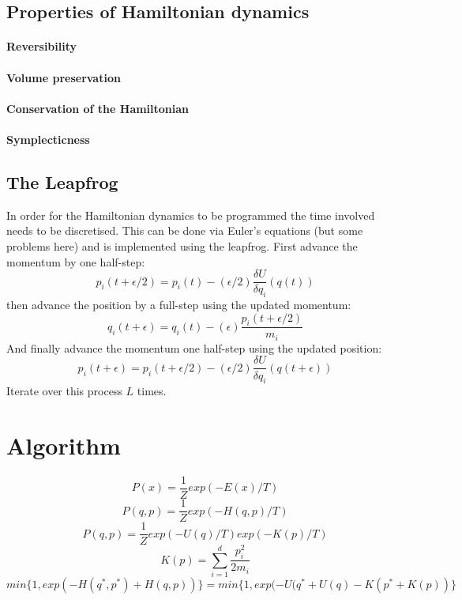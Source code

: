 \documentclass[12pt]{article}
\begin{document}
\subsection{Properties of Hamiltonian dynamics}

\paragraph{Reversibility}
\paragraph{Volume preservation}
\paragraph{Conservation of the Hamiltonian}
\paragraph{Symplecticness}
\subsection{The Leapfrog}
In order for the Hamiltonian dynamics to be programmed the time involved needs to be discretised. This can be done via Euler's equations (but some problems here) and is implemented using the leapfrog.
First advance the momentum by one half-step:
\begin{equation}
p_{i}(t+\epsilon/2) = p_{i}(t) - (\epsilon/2)\frac{\delta U}{\delta q_{i}}(q(t))
\end{equation}
then advance the position by a full-step using the updated momentum:
\begin{equation}
q_{i}(t+\epsilon) = q_{i}(t) - (\epsilon)\frac{p_{i}(t+\epsilon/2)}{m_{i}}
\end{equation}
And finally advance the momentum one half-step using the updated position:
\begin{equation}
p_{i}(t+\epsilon) = p_{i}(t+\epsilon/2) - (\epsilon/2)\frac{\delta U}{\delta q_{i}}(q(t+\epsilon))
\end{equation}
Iterate over this process $L$ times.

\section{Algorithm}
\begin{equation}
P(x) = \frac{1}{Z}exp(-E(x)/T)
\end{equation}
\begin{equation}
P(q,p) = \frac{1}{Z}exp(-H(q,p)/T)
\end{equation}
\begin{equation}
P(q,p) = \frac{1}{Z}exp(-U(q)/T)exp(-K(p)/T)
\end{equation}
\begin{equation}
K(p) = \sum_{i=1}^{d} \frac{p_{i}^{2}}{2m_{i}}
\end{equation}
\begin{equation}
min\{1,exp(-H(q^{*},p^{*})+H(q,p))\} = min\{1, exp(-U(q^{*}+U(q)-K(p^{*}+K(p))\}
\end{equation}
\end{document}
